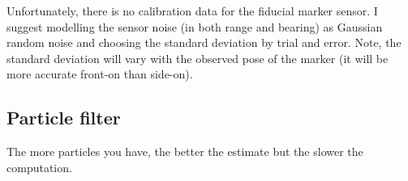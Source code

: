 \documentclass[a4paper, 12]{article}
\begin{document}
Unfortunately, there is no calibration data for the fiducial marker
sensor.  I suggest modelling the sensor noise (in both range and
bearing) as Gaussian random noise and choosing the standard deviation
by trial and error.  Note, the standard deviation will vary with the
observed pose of the marker (it will be more accurate front-on than
side-on).

\subsection{Particle filter}

The more particles you have, the better the estimate but the slower
the computation.
\end{document}
